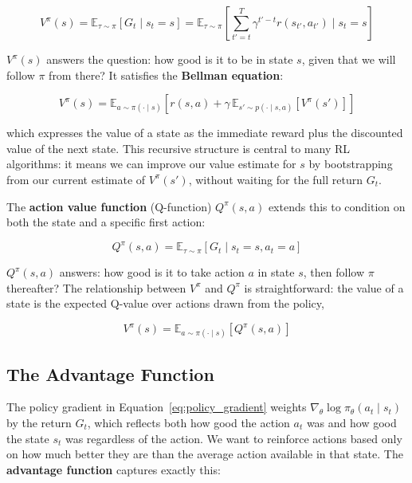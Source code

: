 \documentclass{book}
\begin{document}
\begin{equation}
\label{eq:value_function}
V^\pi(s) = \mathbb{E}_{\tau \sim \pi}\!\left[G_t \mid s_t = s\right]
    = \mathbb{E}_{\tau \sim \pi}\!\left[
    \sum_{t'=t}^{T} \gamma^{t'-t} r(s_{t'}, a_{t'}) \mid s_t = s\right]
\end{equation}

$V^\pi(s)$ answers the question: how good is it to be in state $s$, given
that we will follow $\pi$ from there? It satisfies the \textbf{Bellman
equation}:

\begin{equation}
\label{eq:bellman}
V^\pi(s) = \mathbb{E}_{a \sim \pi(\cdot \mid s)}\!\left[
    r(s, a) + \gamma\, \mathbb{E}_{s' \sim p(\cdot \mid s, a)}[V^\pi(s')]
\right]
\end{equation}

which expresses the value of a state as the immediate reward plus the
discounted value of the next state. This recursive structure is central
to many RL algorithms: it means we can improve our value estimate for $s$
by bootstrapping from our current estimate of $V^\pi(s')$, without waiting
for the full return $G_t$.

The \textbf{action value function} (Q-function) $Q^\pi(s, a)$ extends this
to condition on both the state and a specific first action:

\begin{equation}
\label{eq:q_function}
Q^\pi(s, a) = \mathbb{E}_{\tau \sim \pi}\!\left[G_t \mid s_t = s,
    a_t = a\right]
\end{equation}

$Q^\pi(s, a)$ answers: how good is it to take action $a$ in state $s$,
then follow $\pi$ thereafter? The relationship between $V^\pi$ and $Q^\pi$
is straightforward: the value of a state is the expected Q-value over
actions drawn from the policy,

\begin{equation}
\label{eq:v_q_relation}
V^\pi(s) = \mathbb{E}_{a \sim \pi(\cdot \mid s)}[Q^\pi(s, a)]
\end{equation}

\subsection{The Advantage Function}
\label{sec:advantage}

The policy gradient in Equation~\ref{eq:policy_gradient} weights
$\nabla_\theta \log \pi_\theta(a_t \mid s_t)$ by the return $G_t$, which
reflects both how good the action $a_t$ was and how good the state $s_t$
was regardless of the action. We want to reinforce actions based only on
how much better they are than the average action available in that state.
The \textbf{advantage function} captures exactly this:
\end{document}
